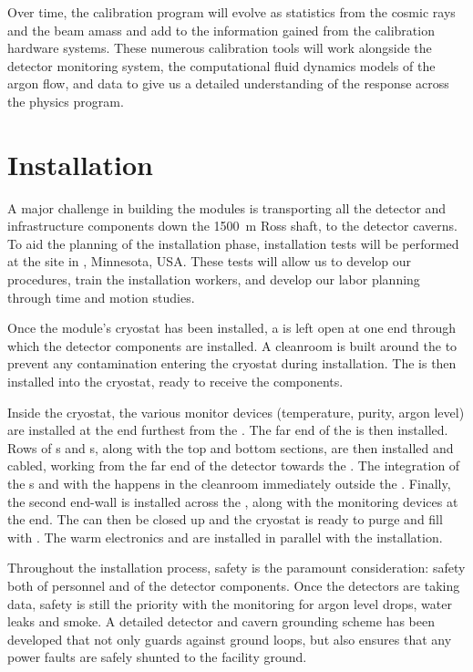 Over time, the  calibration program will evolve as statistics from the cosmic rays and the  beam amass and add to the information gained from the calibration hardware systems. These numerous calibration tools will work alongside the detector monitoring system, the computational fluid dynamics models of the argon flow, and  data to give us a detailed understanding of the  response across the  physics program.


\section{Installation}

A major challenge in building the   modules is transporting all the detector and infrastructure components down the \SI{1500}{\meter} Ross shaft, to the detector caverns. To aid the planning of the installation phase, installation tests will be performed at the   site in , Minnesota, USA. These tests will allow us to develop our procedures, train the installation workers, and develop our labor planning through time and motion studies.

Once the module's cryostat has been installed, a  is left open at one end through which the detector components are installed. A cleanroom is built around the  to prevent any contamination entering the cryostat during installation. The  is then installed into the cryostat, ready to receive the  components. 

Inside the cryostat, the various monitor devices (temperature, purity, argon level) are installed at the end furthest from the . The far end of the  is then installed. Rows of s and s, along with the top and bottom  sections, are then installed and cabled, working from the far end of the detector towards the . The integration of the s and  with the  happens in the cleanroom immediately outside the . Finally, the second  end-wall is installed across the , along with the monitoring devices at the  end. The  can then be closed up and the cryostat is ready to purge and fill with . The warm electronics and  are installed in parallel with the  installation.

Throughout the installation process, safety is the paramount consideration: safety both of personnel and of the detector components. Once the detectors are taking data, safety is still the priority with the  monitoring for argon level drops, water leaks and smoke. A detailed detector and cavern grounding scheme has been developed that not only guards against ground loops, but also ensures that any power faults are safely shunted to the facility ground.

